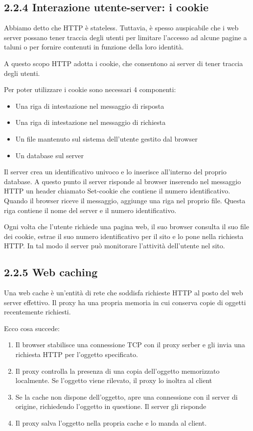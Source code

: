 \documentclass{book}
\begin{document}
\subsection*{2.2.4 Interazione utente-server: i cookie}
Abbiamo detto che HTTP è stateless. Tuttavia, è spesso auspicabile che i web server possano tener traccia degli utenti per limitare l'accesso ad alcune pagine a taluni o per fornire contenuti in funzione della loro identità.

A questo scopo HTTP adotta i cookie, che consentono ai server di tener traccia degli utenti.

Per poter utilizzare i cookie sono necessari 4 componenti:
\begin{itemize}
	\item Una riga di intestazione nel messaggio di risposta
	\item Una riga di intestazione nel messaggio di richiesta
	\item Un file mantenuto sul sistema dell'utente gestito dal browser
	\item Un database sul server
\end{itemize}

Il server crea un identificativo univoco e lo inserisce all'interno del proprio database. A questo punto il server risponde al browser inserendo nel messaggio HTTP un header chiamato Set-cookie che contiene il numero identificativo. Quando il browser riceve il messaggio, aggiunge una riga nel proprio file. Questa riga contiene il nome del server e il numero identificativo.

Ogni volta che l'utente richiede una pagina web, il suo browser consulta il suo file dei cookie, estrae il suo numero identificativo per il sito e lo pone nella richiesta HTTP. In tal modo il server può monitorare l'attività dell'utente nel sito.

\subsection*{2.2.5 Web caching}
Una web cache è un'entità di rete che soddisfa richieste HTTP al posto del web server effettivo. Il proxy ha una propria memoria in cui conserva copie di oggetti recentemente richiesti.

Ecco cosa succede:
\begin{enumerate}
	\item Il browser stabilisce una connessione TCP con il proxy serber e gli invia una richiesta HTTP per l'oggetto specificato.
	\item Il proxy controlla la presenza di una copia dell'oggetto memorizzato localmente. Se l'oggetto viene rilevato, il proxy lo inoltra al client
	\item Se la cache non dispone dell'oggetto, apre una connessione con il server di origine, richiedendo l'oggetto in questione. Il server gli risponde
	\item Il proxy salva l'oggetto nella propria cache e lo manda al client.
\end{enumerate}
\end{document}
